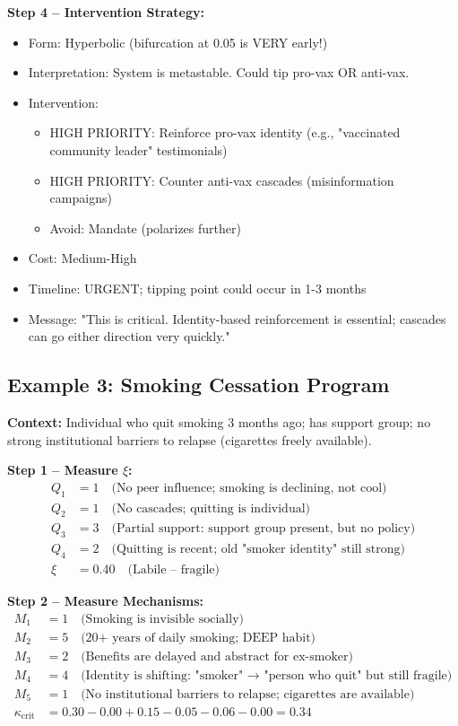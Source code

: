 \documentclass[11pt, a4paper]{article}
\begin{document}
\textbf{Step 4 – Intervention Strategy:}
\begin{itemize}
    \item Form: Hyperbolic (bifurcation at 0.05 is VERY early!)
    \item Interpretation: System is metastable. Could tip pro-vax OR anti-vax.
    \item Intervention:
    \begin{itemize}
        \item HIGH PRIORITY: Reinforce pro-vax identity (e.g., "vaccinated community leader" testimonials)
        \item HIGH PRIORITY: Counter anti-vax cascades (misinformation campaigns)
        \item Avoid: Mandate (polarizes further)
    \end{itemize}
    \item Cost: Medium-High
    \item Timeline: URGENT; tipping point could occur in 1-3 months
    \item Message: "This is critical. Identity-based reinforcement is essential; cascades can go either direction very quickly."
\end{itemize}

\subsection{Example 3: Smoking Cessation Program}

\textbf{Context:} Individual who quit smoking 3 months ago; has support group;
no strong institutional barriers to relapse (cigarettes freely available).

\textbf{Step 1 – Measure $\xi$:}
\begin{align}
Q_1 &= 1 \quad \text{(No peer influence; smoking is declining, not cool)} \\
Q_2 &= 1 \quad \text{(No cascades; quitting is individual)} \\
Q_3 &= 3 \quad \text{(Partial support: support group present, but no policy)} \\
Q_4 &= 2 \quad \text{(Quitting is recent; old "smoker identity" still strong)} \\
\xi &= 0.40 \quad \text{(Labile – fragile)}
\end{align}

\textbf{Step 2 – Measure Mechanisms:}
\begin{align}
M_1 &= 1 \quad \text{(Smoking is invisible socially)} \\
M_2 &= 5 \quad \text{(20+ years of daily smoking; DEEP habit)} \\
M_3 &= 2 \quad \text{(Benefits are delayed and abstract for ex-smoker)} \\
M_4 &= 4 \quad \text{(Identity is shifting: "smoker" → "person who quit" but still fragile)} \\
M_5 &= 1 \quad \text{(No institutional barriers to relapse; cigarettes are available)} \\
\kappa_{\text{crit}} &= 0.30 - 0.00 + 0.15 - 0.05 - 0.06 - 0.00 = 0.34
\end{align}
\end{document}
